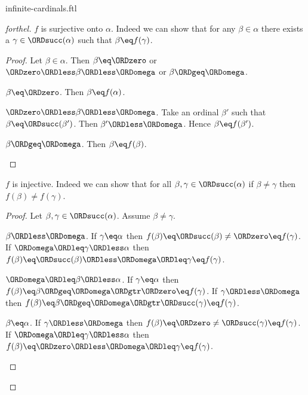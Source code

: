 \documentclass{naproche-library}
\begin{document}
\begin{smodule}[title=Infinite Cardinal Numbers]{infinite-cardinals.ftl}
\begin{proof}[forthel]
  $f$ is surjective onto $\alpha$.
  Indeed we can show that for any $\beta \in \alpha$ there exists a
  $\gamma \in \ORDsucc(\alpha)$ such that $\beta \eq f(\gamma)$.
  \begin{proof}
    Let $\beta \in \alpha$.
    Then $\beta \eq \ORDzero$ or $\ORDzero \ORDless \beta \ORDless \ORDomega$ or $\beta \ORDgeq \ORDomega$.

    \begin{case}{$\beta \eq \ORDzero$.}
      Then $\beta \eq f(\alpha)$.
    \end{case}

    \begin{case}{$\ORDzero \ORDless \beta \ORDless \ORDomega$.}
      Take an ordinal $\beta'$ such that $\beta \eq \ORDsucc(\beta')$.
      Then $\beta' \ORDless \ORDomega$.
      Hence $\beta \eq f(\beta')$.
    \end{case}

    \begin{case}{$\beta \ORDgeq \ORDomega$.}
      Then $\beta \eq f(\beta)$.
    \end{case}
  \end{proof}

  $f$ is injective.
  Indeed we can show that for all $\beta, \gamma \in \ORDsucc(\alpha)$ if
  $\beta \neq \gamma$ then $f(\beta) \neq f(\gamma)$.
  \begin{proof}
    Let $\beta, \gamma \in \ORDsucc(\alpha)$.
    Assume $\beta \neq \gamma$.

    \begin{case}{$\beta \ORDless \ORDomega$.}
      If $\gamma \eq \alpha$ then
      $f(\beta)
        \eq \ORDsucc(\beta)
        \neq \ORDzero
        \eq f(\gamma)$.
      If $\ORDomega \ORDleq \gamma \ORDless \alpha$ then
      $f(\beta)
        \eq \ORDsucc(\beta)
        \ORDless \ORDomega
        \ORDleq \gamma
        \eq f(\gamma)$.
    \end{case}

    \begin{case}{$\ORDomega \ORDleq \beta \ORDless \alpha$.}
      If $\gamma \eq \alpha$ then
      $f(\beta)
        \eq \beta
        \ORDgeq \ORDomega
        \ORDgtr \ORDzero
        \eq f(\gamma)$.
      If $\gamma \ORDless \ORDomega$ then
      $f(\beta)
        \eq \beta
        \ORDgeq \ORDomega
        \ORDgtr \ORDsucc(\gamma)
        \eq f(\gamma)$.
    \end{case}

    \begin{case}{$\beta \eq \alpha$.}
      If $\gamma \ORDless \ORDomega$ then
      $f(\beta)
        \eq \ORDzero
        \neq \ORDsucc(\gamma)
        \eq f(\gamma)$.
      If $\ORDomega \ORDleq \gamma \ORDless \alpha$ then
      $f(\beta)
        \eq \ORDzero
        \ORDless \ORDomega
        \ORDleq \gamma
        \eq f(\gamma)$.
    \end{case}
  \end{proof}


\end{proof}
\end{smodule}
\end{document}
